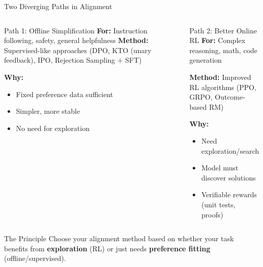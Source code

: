 \documentclass[xcolor=svgnames, 10pt, handout]{beamer}
\begin{document}
\begin{frame}{Two Diverging Paths in Alignment}

    \begin{columns}[T]
    \begin{block}{Path 1: Offline Simplification}
        \textbf{For:} Instruction following, safety, general helpfulness
        \pause
        \vspace{0.3cm}
        \textbf{Method:} Supervised-like approaches (DPO, KTO (unary feedback), IPO, Rejection Sampling + SFT)
        \pause

        \vspace{0.3cm}

        \textbf{Why:}
        \begin{itemize}
            \item Fixed preference data sufficient
            \item Simpler, more stable
            \item No need for exploration
        \end{itemize}
    \end{block}

    \pause
    \begin{block}{Path 2: Better Online RL}
        \textbf{For:} Complex reasoning, math, code generation
        \pause

        \vspace{0.3cm}
        \textbf{Method:} Improved RL algorithms (PPO, GRPO, Outcome-based RM)
        \pause
        \vspace{0.3cm}

        \textbf{Why:}
        \begin{itemize}
            \item Need exploration/search
            \item Model must discover solutions
            \item Verifiable rewards (unit tests, proofs)
        \end{itemize}
    \end{block}
    \end{columns}
    \pause

    \vspace{0.3cm}
    \begin{alertblock}{The Principle}
        Choose your alignment method based on whether your task benefits from \textbf{exploration} (RL) or just needs \textbf{preference fitting} (offline/supervised).
    \end{alertblock}
\end{frame}
\end{document}
